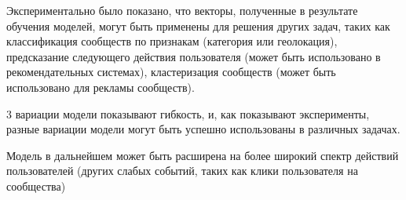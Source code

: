 \documentclass[times,specification,annotation]{itmo-student-thesis}
\begin{document}
Экспериментально было показано, что векторы, полученные в результате обучения моделей, могут быть применены для решения других задач, таких как классификация сообществ по признакам (категория или геолокация), предсказание следующего действия пользователя (может быть использовано в рекомендательных системах), кластеризация сообществ (может быть использовано для рекламы сообществ).

3 вариации модели показывают гибкость, и, как показывают эксперименты, разные вариации модели могут быть успешно использованы в различных задачах. 

Модель в дальнейшем может быть расширена на более широкий спектр действий пользователей (других слабых событий, таких как клики пользователя на сообщества) 

\printmainbibliography

\appendix
\end{document}
